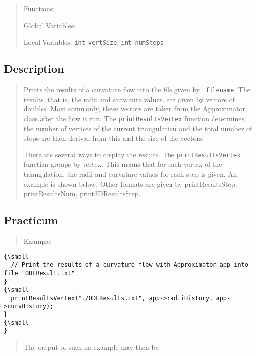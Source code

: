 \begin{quotation}
Functions:

Global Variables:

Local Variables: \texttt{int vertSize}, \texttt{int numSteps}
\end{quotation}

\subsection*{Description}

\begin{quotation}
Prints the results of a curvature flow into the file given by \texttt{%
filename}. The results, that is, the radii and curvature values, are given
by vectors of doubles. Most commonly, these vectors are taken from the
Approximator class after the flow is run. The \texttt{printResultsVertex}
function determines the number of vertices of the current triangulation and
the total number of steps are then derived from this and the size of the
vectors.

There are several ways to display the results. The \texttt{printResultsVertex%
} function groups by vertex. This means that for each vertex of the
triangulation, the radii and curvature values for each step is given. An
example is shown below. Other formats are given by printResultsStep,
printResultsNum, print3DResultsStep.
\end{quotation}

\subsection*{Practicum}

\begin{quotation}
Example:{\small }
\end{quotation}

\begin{verbatim}
{\small 
  // Print the results of a curvature flow with Approximator app into file "ODEResult.txt"
}
{\small 
  printResultsVertex("./ODEResults.txt", app->radiiHistory, app->curvHistory);
}
{\small   
}
\end{verbatim}

\begin{quotation}
The output of such an example may then be{\small }
\end{quotation}

